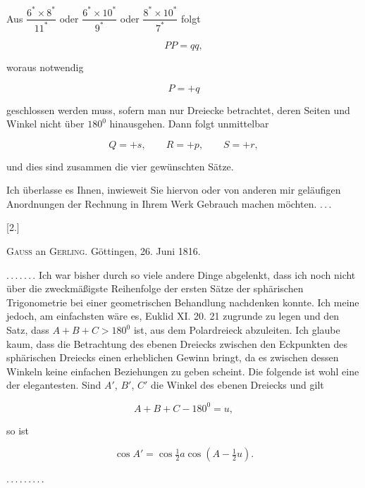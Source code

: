 Aus $\dfrac{6^\ast\times 8^\ast}{11^\ast}$ oder $\dfrac{6^\ast\times 10^\ast}{9^\ast}$ oder $\dfrac{8^\ast\times 10^\ast}{7^\ast}$ folgt

\[
PP=qq,
\]

woraus notwendig

\[
P=+q
\]

geschlossen werden muss, sofern man nur Dreiecke betrachtet, deren Seiten und Winkel nicht über $180^0$ hinausgehen. Dann folgt unmittelbar

\[
Q=+s,\qquad R=+p,\qquad S=+r,
\]

und dies sind zusammen die vier gewünschten Sätze.

Ich überlasse es Ihnen, inwieweit Sie hiervon oder von anderen mir geläufigen Anordnungen der Rechnung in Ihrem Werk Gebrauch machen möchten. \mbox{.\,.\,.}

\medskip

\begin{center}
[2.]

\textsc{Gauss} an \textsc{Gerling}. Göttingen, 26. Juni 1816.
\end{center}

\mbox{.\,.\,.\,.\,.\,.\,.} Ich war bisher durch so viele andere Dinge abgelenkt, dass ich noch nicht über die zweckmäßigste Reihenfolge der ersten Sätze der sphärischen Trigonometrie bei einer geometrischen Behandlung nachdenken konnte. Ich meine jedoch, am einfachsten wäre es, Euklid XI. 20. 21 zugrunde zu legen und den Satz, dass $A+B+C>180^0$ ist, aus dem Polardreieck abzuleiten. Ich glaube kaum, dass die Betrachtung des ebenen Dreiecks zwischen den Eckpunkten des sphärischen Dreiecks einen erheblichen Gewinn bringt, da es zwischen dessen Winkeln keine  einfachen Beziehungen zu geben scheint. Die folgende ist wohl eine der elegantesten. Sind $A'$, $B'$, $C'$ die Winkel des ebenen Dreiecks und gilt

\[
A+B+C-180^0=u,
\]

so ist

\[
\cos A'=\cos\tfrac{1}{2}a\cos(A-\tfrac{1}{2}u).
\]

\mbox{.\,.\,.\,.\,.\,.\,.\,.\,.}
